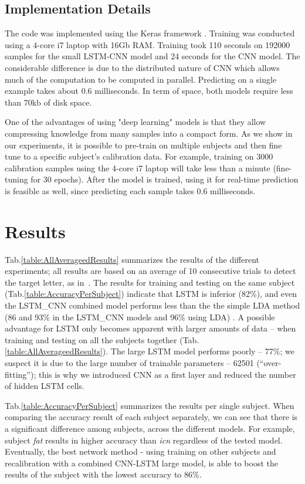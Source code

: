 \documentclass[
12pt, %
english, %
doublespacing, %
headsepline, %
]{MastersDoctoralThesis} %
\begin{document}
\section{Implementation Details}
The code was implemented using the Keras framework \cite{chollet2015keras}. Training was conducted using a 4-core i7 laptop with 16Gb RAM. Training took 110 seconds on 192000 samples for the small LSTM-CNN model and 24 seconds for the CNN model. The considerable difference is due to the distributed nature of  CNN which allows much of the computation to be computed in parallel. Predicting on a single example takes about 0.6 milliseconds. In term of space, both models require less than 70kb of disk space.

One of the advantages of using "deep learning" models is that they allow compressing knowledge from many samples into a compact form. As we show in our experiments, it is possible to pre-train on multiple subjects and then fine tune to a specific subject's calibration data. For example, training on 3000 calibration samples using the 4-core i7 laptop will take less than a minute (fine-tuning for 30 epochs). After the model is trained, using it for real-time prediction is feasible as well, since predicting each sample takes 0.6 milliseconds.

\chapter{Results}

Tab.\ref{table:AllAverageedResults} summarizes the results of the different experiments; all results are based on an average of 10 consecutive trials to detect the target letter, as in~\cite{BlaknertzExperiment}. The results for training and testing on the same subject (Tab.\ref{table:AccuracyPerSubject}) indicate that LSTM is inferior (82\%), and even the LSTM\_CNN combined model performs less than the the simple LDA method (86 and 93\% in the LSTM\_CNN models and 96\% using LDA) . A possible advantage for LSTM only becomes apparent with larger amounts of data -- when training and testing on all the subjects together (Tab.\ref{table:AllAverageedResults}). The large LSTM model performs poorly -- 77\%; we suspect it is due to the large number of trainable parameters -- 62501 (``over-fitting''); this is why we introduced CNN as a first layer and reduced the number of hidden LSTM cells.

Tab.\ref{table:AccuracyPerSubject} summarizes the results per single subject. When comparing the accuracy result of each subject separately, we can see that there is a significant difference among subjects, across the different models. For example, subject \textit{fat} results in higher accuracy than \textit{icn} regardless of the tested model. Eventually, the best network method - using training on other subjects and recalibration with a combined CNN-LSTM large model, is able to boost the results of the subject with the lowest accuracy to 86\%.
\end{document}
